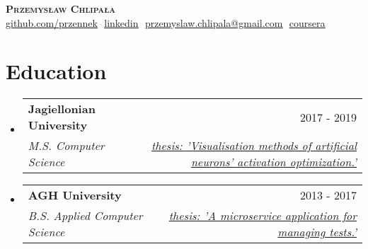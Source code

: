 \documentclass[letterpaper,11pt]{article}
\makeatletter
\newcommand{\resumeSubheading}[4]{
  \vspace{-2pt}\item
    \begin{tabular*}{0.97\textwidth}[t]{l@{\extracolsep{\fill}}r}
      \textbf{#1} & #2 \\
      \textit{\small#3} & \textit{\small #4} \\
    \end{tabular*}\vspace{-7pt}
}
\newcommand{\resumeSubHeadingListStart}{\begin{itemize}[leftmargin=0.15in, label={}]}
\newcommand{\resumeSubHeadingListEnd}{\end{itemize}}
\makeatother
\begin{document}

\begin{center}
    \textbf{\Huge \scshape Przemysław Chlipała} \\ \vspace{8pt}
    \small 
    \href{https://github.com/przennek}{\underline{github.com/przennek}} $  $
    \href{https://www.linkedin.com/in/przemys%C5%82aw-chlipa%C5%82a-712aa7106/}{\underline{linkedin}} $  $
    \href{mailto:przemyslaw.chlipala@gmail.com}
    {\underline{przemyslaw.chlipala@gmail.com}} $ $
    \href{https://www.coursera.org/user/2f79a023ccc47ab66ca3c0ca67fd77aa}{\underline{coursera}}
\end{center}
\section{Education}
  \resumeSubHeadingListStart
  
    \resumeSubheading
      {Jagiellonian University}{2017 - 2019}
      {M.S. Computer Science}{\href{https://github.com/przennek/neurons_activation_visualisation/blob/master/latex/praca.pdf}{thesis: 'Visualisation methods of artificial neurons' activation optimization.'}}

    \resumeSubheading
      {AGH University}{2013 - 2017}
      {B.S. Applied Computer Science}{\href{https://misio.fis.agh.edu.pl/media/misiofiles/f697b33ada0bf415d95135a7010466a9.pdf}{thesis: 'A microservice application for managing tests.'}}
      
  \resumeSubHeadingListEnd
\end{document}
